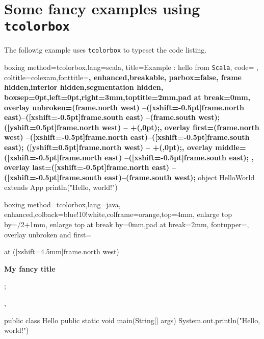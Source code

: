 \documentclass[10pt,a4paper]{article}
\begin{document}

\section{Some fancy examples using \texttt{tcolorbox}}

The followig example uses \texttt{tcolorbox} to typeset the code
listing.

\newlength{\examlen}

\begin{pygmented}{boxing method=tcolorbox,lang=scala,
title=Example : hello from \texttt{Scala},
code={%
},%
coltitle=colexam,fonttitle=\Large\bfseries,
enhanced,breakable,
parbox=false,
frame hidden,interior hidden,segmentation hidden,
boxsep=0pt,left=0pt,right=3mm,toptitle=2mm,pad at break=0mm,
overlay unbroken={\draw[colexam,line width=1pt] (frame.north west)
--([xshift=-0.5pt]frame.north east)--([xshift=-0.5pt]frame.south east)
--(frame.south west);
\draw[colexam,line width=2pt] ([yshift=0.5pt]frame.north west)
-- +(\examlen,0pt);},
overlay first={\draw[colexam,line width=1pt] (frame.north west)
--([xshift=-0.5pt]frame.north east)--([xshift=-0.5pt]frame.south east);
\draw[red!75!black,line width=2pt] ([yshift=0.5pt]frame.north west)
-- +(\examlen,0pt);},
overlay middle={\draw[colexam,line width=1pt] ([xshift=-0.5pt]frame.north east)
--([xshift=-0.5pt]frame.south east); },
overlay last={\draw[colexam,line width=1pt] ([xshift=-0.5pt]frame.north east)
--([xshift=-0.5pt]frame.south east)--(frame.south west);}%
}
object HelloWorld extends App {
println("Hello, world!")
}\end{pygmented}

\begin{pygmented}{boxing method=tcolorbox,lang=java,
enhanced,colback=blue!10!white,colframe=orange,top=4mm,
enlarge top by=\baselineskip/2+1mm,
enlarge top at break by=0mm,pad at break=2mm,
fontupper=\normalsize,
overlay unbroken and first={%
\node[rectangle,rounded corners,draw=black,fill=blue!20!white,
inner sep=1mm,anchor=west,font=\small]
at ([xshift=4.5mm]frame.north west) {\strut\textbf{My fancy title}};},
}
public class Hello {
public static void main(String[] args) {
System.out.println("Hello, world!")
}
}
\end{pygmented}
\end{document}
